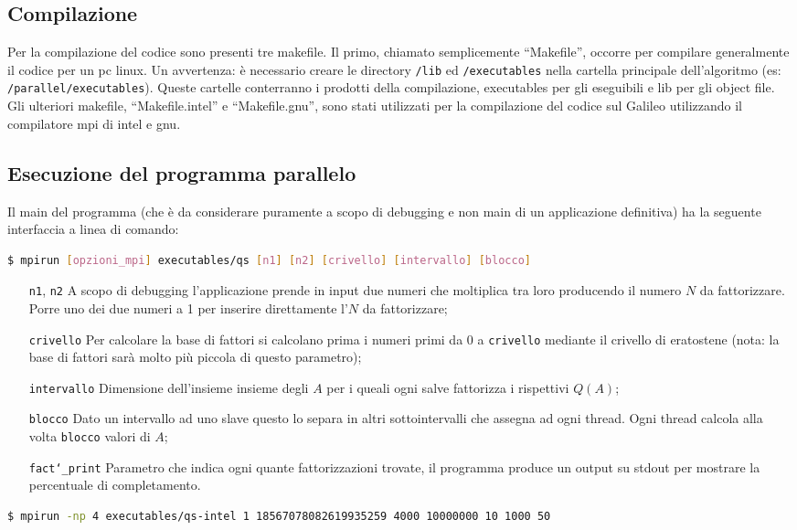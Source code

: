 \subsection{Compilazione}
Per la compilazione del codice sono presenti tre makefile.
Il primo, chiamato semplicemente ``Makefile'', occorre per compilare
generalmente il codice per un pc linux. Un avvertenza: è necessario
creare le directory \texttt{/lib} ed \texttt{/executables} nella cartella principale
dell'algoritmo (es: \texttt{/parallel/executables}). Queste cartelle conterranno i
prodotti della compilazione, executables per gli eseguibili e lib per
gli object file.
Gli ulteriori makefile, ``Makefile.intel'' e ``Makefile.gnu'', sono stati
utilizzati per la compilazione del codice sul Galileo utilizzando
il compilatore mpi di intel e gnu.
\subsection{Esecuzione del programma parallelo}
Il main del programma (che è da considerare puramente
a scopo di debugging e non main di un applicazione definitiva)
ha la seguente interfaccia a linea di comando:
\begin{lstlisting}[language=bash]
  $ mpirun [opzioni_mpi] executables/qs [n1] [n2] [crivello] [intervallo] [blocco]
\end{lstlisting}
\begin{itemize}
\item[\texttt{n1}, \texttt{n2}] A scopo di debugging l'applicazione prende
in input due numeri che moltiplica tra loro producendo il numero $N$
da fattorizzare. Porre uno dei due numeri a 1 per inserire
direttamente l'$N$ da fattorizzare;
\item[\texttt{crivello}] Per calcolare la
base di fattori si calcolano prima i numeri primi da  
0 a \texttt{crivello} mediante il crivello di eratostene (nota: la
base di fattori sarà molto più piccola di questo parametro);
\item[\texttt{intervallo}] Dimensione dell'insieme insieme degli $A$
per i queali ogni salve fattorizza i rispettivi $Q(A)$; 
\item[\texttt{blocco}] Dato un intervallo ad uno slave questo lo separa in
altri sottointervalli che assegna ad ogni thread. Ogni thread calcola
alla volta \texttt{blocco} valori di $A$;
\item[\texttt{fact\char`_print}] Parametro che indica ogni quante fattorizzazioni trovate, il programma produce un
output su stdout per mostrare la percentuale di completamento.
\end{itemize}
\begin{lstlisting}[language=bash]
$ mpirun -np 4 executables/qs-intel 1 18567078082619935259 4000 10000000 10 1000 50
\end{lstlisting}
